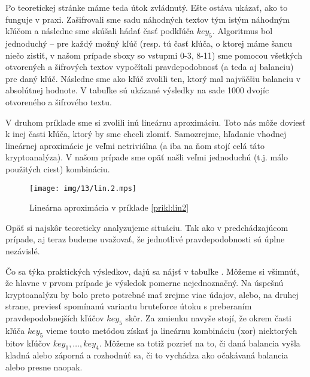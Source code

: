 \begin{priklad}
    Po teoretickej stránke máme teda útok zvládnutý. Ešte ostáva
    ukázať, ako to funguje v praxi. Zašifrovali sme sadu náhodných
    textov tým istým náhodným kľúčom a následne sme skúšali hádať časť
    podkľúča $key_5$. Algoritmus bol jednoduchý -- pre každý možný
    kľúč (resp. tú časť kľúča, o ktorej máme šancu niečo zistiť, v
    našom prípade sboxy so vstupmi 0-3, 8-11) sme pomocou všetkých
    otvorených a šifrových textov vypočítali pravdepodobnosť (a teda
    aj balanciu) pre daný kľúč. Následne sme ako kľúč zvolili ten,
    ktorý mal najväčšiu balanciu v absolútnej hodnote. V tabuľke
     sú ukázané výsledky na sade 1000 dvojíc otvoreného a
    šifrového textu.
    
\end{priklad}

\begin{priklad}
    \label{prikl:lin2}
    V druhom príklade sme si zvolili inú lineárnu aproximáciu. Toto
    nás môže doviesť k inej časti kľúča, ktorý by sme chceli zlomiť.
    Samozrejme, hľadanie vhodnej lineárnej aproximácie je veľmi
    netriviálna (a iba na ňom stojí celá táto kryptoanalýza). V našom
    prípade sme opäť našli veľmi jednoduchú (t.j. málo použitých
    ciest) kombináciu.
    \begin{figure}[H]
        \centering
        \texttt{[image: img/13/lin.2.mps]}
        \caption{Lineárna aproximácia v príklade \ref{prikl:lin2}}
    \end{figure}
    Opäť si najskôr teoreticky analyzujeme situáciu. Tak ako v
    predchádzajúcom prípade, aj teraz budeme uvažovať, že jednotlivé
    pravdepodobnosti sú úplne nezávislé.
    

    Čo sa týka praktických výsledkov, dajú sa nájsť v tabuľke
    . Môžeme si všimnúť, že hlavne v prvom prípade je
    výsledok pomerne nejednoznačný. Na úspešnú kryptoanalýzu by bolo
    preto potrebné mať zrejme viac údajov, alebo, na druhej strane,
    previesť spomínanú variantu bruteforce útoku s preberaním
    pravdepodobnejších kľúčov $key_5$ skôr. Za zmienku navyše stojí,
    že okrem časti kľúča $key_5$ vieme touto metódou získať ja
    lineárnu kombináciu (xor) niektorých bitov kľúčov $key_1, \dots,
    key_4$. Môžeme sa totiž pozrieť na to, či daná balancia vyšla
    kladná alebo záporná a rozhodnúť sa, či to vychádza ako očakávaná
    balancia alebo presne naopak.

    
\end{priklad}



